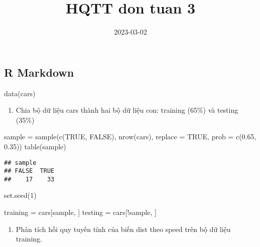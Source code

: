 \documentclass[
]{article}
\title{HQTT don tuan 3}
\author{}
\date{\vspace{-2.5em}2023-03-02}
\newenvironment{Shaded}{\begin{snugshade}}{\end{snugshade}}
\newcommand{\AttributeTok}[1]{\textcolor[rgb]{0.77,0.63,0.00}{#1}}
\newcommand{\ConstantTok}[1]{\textcolor[rgb]{0.00,0.00,0.00}{#1}}
\newcommand{\DecValTok}[1]{\textcolor[rgb]{0.00,0.00,0.81}{#1}}
\newcommand{\FloatTok}[1]{\textcolor[rgb]{0.00,0.00,0.81}{#1}}
\newcommand{\FunctionTok}[1]{\textcolor[rgb]{0.00,0.00,0.00}{#1}}
\newcommand{\NormalTok}[1]{#1}
\newcommand{\OtherTok}[1]{\textcolor[rgb]{0.56,0.35,0.01}{#1}}
\newcommand{\SpecialCharTok}[1]{\textcolor[rgb]{0.00,0.00,0.00}{#1}}
\providecommand{\tightlist}{%
  \setlength{\itemsep}{0pt}\setlength{\parskip}{0pt}}
\begin{document}
\maketitle

\hypertarget{r-markdown}{%
\subsection{R Markdown}\label{r-markdown}}

\begin{Shaded}
\begin{Highlighting}[]
\FunctionTok{data}\NormalTok{(cars)}
\end{Highlighting}
\end{Shaded}

\begin{enumerate}
\def\labelenumi{\arabic{enumi}.}
\tightlist
\item
  Chia bộ dữ liệu cars thành hai bộ dữ liệu con: training (65\%) và
  testing (35\%)
\end{enumerate}

\begin{Shaded}
\begin{Highlighting}[]
\NormalTok{sample }\OtherTok{=} \FunctionTok{sample}\NormalTok{(}\FunctionTok{c}\NormalTok{(}\ConstantTok{TRUE}\NormalTok{, }\ConstantTok{FALSE}\NormalTok{), }\FunctionTok{nrow}\NormalTok{(cars), }\AttributeTok{replace =} \ConstantTok{TRUE}\NormalTok{, }\AttributeTok{prob =} \FunctionTok{c}\NormalTok{(}\FloatTok{0.65}\NormalTok{, }\FloatTok{0.35}\NormalTok{))}
\FunctionTok{table}\NormalTok{(sample)}
\end{Highlighting}
\end{Shaded}

\begin{verbatim}
## sample
## FALSE  TRUE 
##    17    33
\end{verbatim}

\begin{Shaded}
\begin{Highlighting}[]
\FunctionTok{set.seed}\NormalTok{(}\DecValTok{1}\NormalTok{)}

\NormalTok{training }\OtherTok{=}\NormalTok{ cars[sample, ]}
\NormalTok{testing }\OtherTok{=}\NormalTok{ cars[}\SpecialCharTok{!}\NormalTok{sample, ]}
\end{Highlighting}
\end{Shaded}

\begin{enumerate}
\def\labelenumi{\arabic{enumi}.}
\setcounter{enumi}{1}
\tightlist
\item
  Phân tích hồi quy tuyến tính của biến dist theo speed trên bộ dữ liệu
  training.
\end{enumerate}
\end{document}
